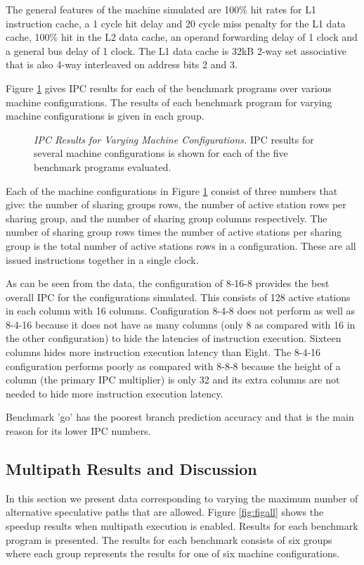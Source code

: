 \documentclass[10pt,dvips]{article}
\begin{document}
The general features of
the machine simulated are 100\% hit rates for L1 instruction cache,
a 1 cycle hit delay and 20 cycle miss penalty for the L1 data cache,
100\% hit in the L2 data cache, an operand forwarding delay of 1 clock
and a general bus delay of 1 clock.  The L1 data cache is 32kB 2-way
set associative that is also 4-way interleaved on address bits 2 and 3.

Figure \ref{fig:ipc} gives IPC results for each of the benchmark
programs over various machine configurations.
The results of each benchmark program for varying machine
configurations is given in each group.  

\begin{figure}
\vspace{0.2 in}
\setlength{\epsfxsize}{10cm}%
\centerline{}
\caption{{\em IPC Results for Varying Machine Configurations.} 
IPC results for several machine configurations is shown for each of
the five benchmark programs evaluated.}
\label{fig:ipc}
\end{figure}

Each of the machine configurations in Figure \ref{fig:ipc} consist of
three numbers that give: the number of sharing groups rows, the number of
active station rows per sharing group, and the number of sharing group
columns respectively.  The number of sharing group rows times the number
of active stations per sharing group is the total number of active
stations rows in a configuration.  These are all issued instructions
together in a single clock.

As can be seen from the data, the configuration of 8-16-8 provides
the best overall IPC for the configurations simulated.  This consists
of 128 active stations in each column with 16 columns.
Configuration 8-4-8 does not perform as well as 8-4-16 because it does not
have as many columns (only 8 as compared with 16 in the other configuration)
to hide the latencies of instruction execution.  Sixteen columns 
hides more instruction execution latency than Eight.  The 8-4-16
configuration performs poorly as compared with 8-8-8 because the height
of a column (the primary IPC multiplier) is only 32 and its extra
columns are not needed to hide more instruction execution latency.

Benchmark 'go' has the poorest branch prediction accuracy and that is 
the main reason for its lower IPC numbers.  
%
\subsection{Multipath Results and Discussion}
%
In this section we present data corresponding to varying the
maximum number of alternative speculative paths that are allowed.
Figure \ref{fig:figall} shows the speedup results
when multipath execution is enabled.  Results for
each benchmark program is presented.  The results for each benchmark 
consists of six groups where each group represents the results
for one of six machine configurations.
\end{document}
